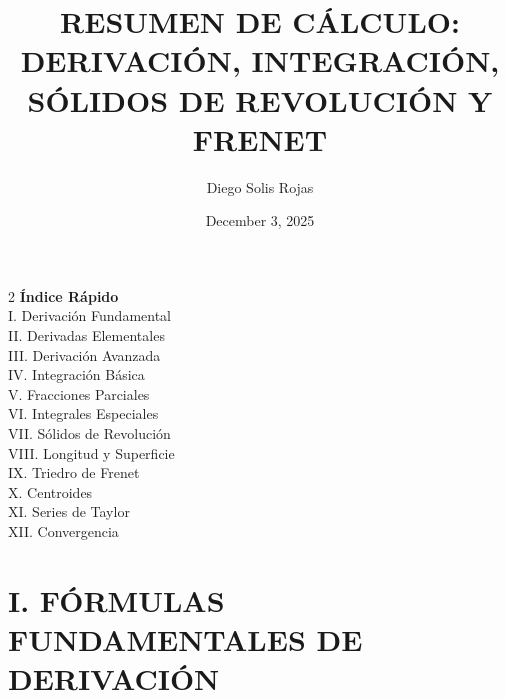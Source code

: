 \documentclass[12pt, a4paper]{article}
\title{\color{titleblue}\textbf{RESUMEN DE CÁLCULO: DERIVACIÓN, INTEGRACIÓN, SÓLIDOS DE REVOLUCIÓN Y FRENET}}
\author{\color{titleblue}Diego Solis Rojas}
\date{\color{titleblue}December 3, 2025}
\begin{document}
\maketitle
\thispagestyle{empty}

\begin{center}
\end{center}

\begin{multicols}{2}
\footnotesize
\noindent\textbf{\color{titleblue}Índice Rápido}\\
I. Derivación Fundamental \\
II. Derivadas Elementales \\
III. Derivación Avanzada \\
IV. Integración Básica \\
V. Fracciones Parciales \\
VI. Integrales Especiales \\
VII. Sólidos de Revolución \\
VIII. Longitud y Superficie \\
IX. Triedro de Frenet \\
X. Centroides \\
XI. Series de Taylor \\
XII. Convergencia
\end{multicols}

\vspace{1em}

\section*{I. FÓRMULAS FUNDAMENTALES DE DERIVACIÓN}
\end{document}
